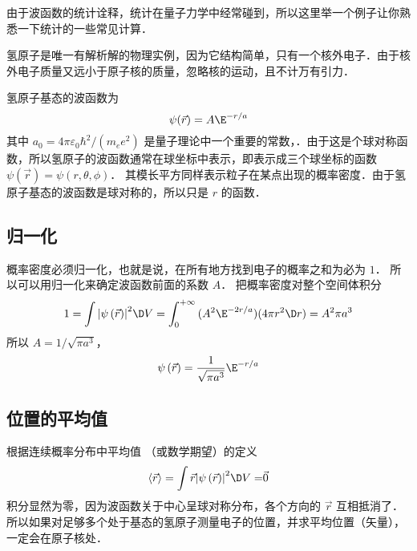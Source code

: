 

由于波函数的统计诠释，统计在量子力学中经常碰到，所以这里举一个例子让你熟悉一下统计的一些常见计算．

氢原子是唯一有解析解的物理实例，因为它结构简单，只有一个核外电子．由于核外电子质量又远小于原子核的质量，忽略核的运动，且不计万有引力．

氢原子基态的波函数为
\begin{equation}
\psi(\vec r) = A\E^{-r/a}
\end{equation}
其中 ${a_0} = {{4\pi {\varepsilon_0}{\hbar ^2}}}/({{{m_e}{e^2}}})$ 是量子理论中一个重要的常数，．由于这是个球对称函数，所以氢原子的波函数通常在球坐标中表示，即表示成三个球坐标的函数 $\psi \left( {\vec r} \right) = \psi \left( {r,\theta ,\phi } \right)$． 其模长平方同样表示粒子在某点出现的概率密度．由于氢原子基态的波函数是球对称的，所以只是 $r$ 的函数．

\subsection{归一化}
  
概率密度必须归一化，也就是说，在所有地方找到电子的概率之和为必为 $1$． 所以可以用归一化来确定波函数前面的系数 $A$． 把概率密度对整个空间体积分
\begin{equation}
    1 = \int {{{\left| {\psi \left( {\vec r} \right)} \right|}^2} \D V}  = \int_0^{ + \infty } {(A^2 \E^{-2r/a})(4\pi r^2\D r)}  = {A^2}\pi {a^3}
\end{equation}
所以 $A = {1}/{{\sqrt {\pi {a^3}} }}$， 
\begin{equation}
\psi \left( {\vec r} \right) = \frac{1}{{\sqrt {\pi {a^3}} }}{\E^{-r/a}}
\end{equation}

\subsection{位置的平均值}

 根据连续概率分布中平均值%
（或数学期望）的定义
\begin{equation}
\left\langle {\vec r} \right\rangle  = \int {\vec r{{\left| {\psi \left( {\vec r} \right)} \right|}^2} \D V = } \vec 0
\end{equation}
积分显然为零，因为波函数关于中心呈球对称分布，各个方向的 $\vec r$ 互相抵消了．所以如果对足够多个处于基态的氢原子测量电子的位置，并求平均位置（矢量）， 一定会在原子核处．

